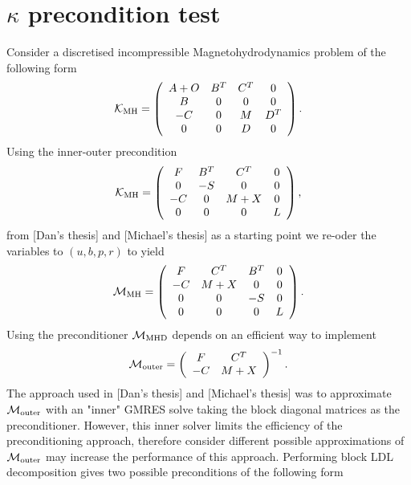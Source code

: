 \documentclass{article}
\begin{document}
\section{$\kappa$ precondition test}

Consider a discretised incompressible Magnetohydrodynamics problem of the following form
\begin{equation} \label{eq:K}
    {\mathcal K}_{\rm MH} = \left(
\begin{array}{cccc}
A+O & B^T & C^T & 0\\
B & 0 & 0 & 0\\
-C & 0 & M & D^T \\
0 & 0 & D & 0
\end{array}
\right).
\end{equation}
Using the inner-outer precondition 
\begin{equation}
\label{eq:mhd_pc_ls}
\mathcal{K}_{\rm MH} =
\left(
\begin{array}{cccc}
F & B^T & C^T & 0\\
0 & -{S} & 0 & 0 \\
-C & 0 & M+X & 0\\
0 & 0 & 0 & L
\end{array}
\right),
\end{equation}
from [Dan's thesis] and [Michael's thesis] as a starting point we re-oder the variables to $(u,b,p,r)$ to yield
\begin{equation}
\label{eq:mhd_pc_ls}
\mathcal{M}_{\rm MH} =
\left(
\begin{array}{cccc}
F & C^T & B^T & 0\\
-C & M+X & 0 & 0 \\
0 & 0 & -S & 0\\
0 & 0 & 0 & L
\end{array}
\right).
\end{equation}
Using the preconditioner $\mathcal{M}_{\rm MHD}$ depends on an efficient way to implement
\begin{equation}
\label{eq:mhd_pc_ls}
\mathcal{M}_{\rm outer}=\left(
\begin{array}{cc}
F & C^T \\
-C & M+X 
\end{array}
\right)^{-1}.
\end{equation}
The approach used in [Dan's thesis] and [Michael's thesis] was to approximate $\mathcal{M}_{\rm outer}$ with an "inner" GMRES solve taking the block diagonal matrices as the preconditioner. However, this inner solver limits the efficiency of the preconditioning approach, therefore consider different possible approximations of $\mathcal{M}_{\rm outer}$ may increase the performance of this approach. Performing block LDL decomposition gives two possible preconditions of the following form
\end{document}
